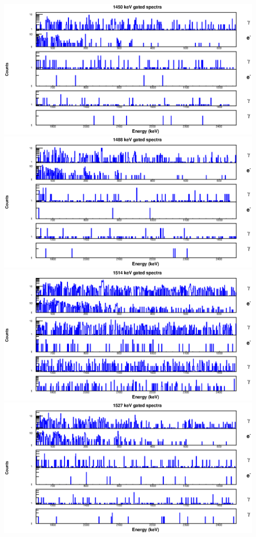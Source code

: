 \begin{landscape}
\includegraphics[scale=1.2]{154Gd_Appendix/1450_combined.eps}
\includegraphics[scale=1.2]{154Gd_Appendix/1488_combined.eps}
\includegraphics[scale=1.2]{154Gd_Appendix/1514_combined.eps}
\includegraphics[scale=1.2]{154Gd_Appendix/1527_combined.eps}

\end{landscape}
